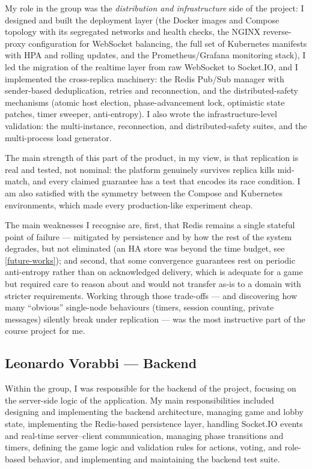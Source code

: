 \documentclass{scrartcl}
\begin{document}
My role in the group was the \emph{distribution and infrastructure} side of the
project: I designed and built the deployment layer (the Docker images and Compose
topology with its segregated networks and health checks, the NGINX reverse-proxy
configuration for WebSocket balancing, the full set of Kubernetes manifests with
HPA and rolling updates, and the Prometheus/Grafana monitoring stack), I led the
migration of the realtime layer from raw WebSocket to Socket.IO, and I implemented
the cross-replica machinery: the Redis Pub/Sub manager with sender-based
deduplication, retries and reconnection, and the distributed-safety mechanisms
(atomic host election, phase-advancement lock, optimistic state patches, timer
sweeper, anti-entropy). I also wrote the infrastructure-level validation: the
multi-instance, reconnection, and distributed-safety suites, and the multi-process
load generator.

The main strength of this part of the product, in my view, is that replication is
real and tested, not nominal: the platform genuinely survives replica kills
mid-match, and every claimed guarantee has a test that encodes its race condition.
I am also satisfied with the symmetry between the Compose and Kubernetes
environments, which made every production-like experiment cheap.

The main weaknesses I recognise are, first, that Redis remains a single stateful
point of failure --- mitigated by persistence and by how the rest of the system
degrades, but not eliminated (an HA store was beyond the time budget, see
\cref{future-works}); and second, that some convergence guarantees rest on
periodic anti-entropy rather than on acknowledged delivery, which is adequate for
a game but required care to reason about and would not transfer as-is to a domain
with stricter requirements. Working through those trade-offs --- and discovering
how many ``obvious'' single-node behaviours (timers, session counting, private
messages) silently break under replication --- was the most instructive part of
the course project for me.

\subsection{Leonardo Vorabbi --- Backend}

Within the group, I was responsible for the backend of the project, focusing on
the server-side logic of the application. My main responsibilities included
designing and implementing the backend architecture, managing game and lobby
state, implementing the Redis-based persistence layer, handling Socket.IO events
and real-time server--client communication, managing phase transitions and
timers, defining the game logic and validation rules for actions, voting, and
role-based behavior, and implementing and maintaining the backend test suite.
\end{document}
